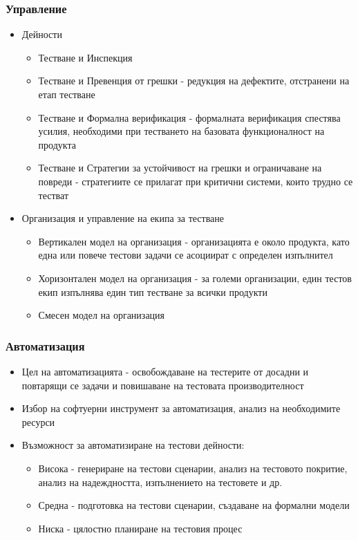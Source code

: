 \documentclass[fleqn,12pt]{article}
\begin{document}
\begin{flushleft}
\subsubsection{Управление}
    \begin{itemize}
        \item Дейности
        \begin{itemize}
            \item Тестване и Инспекция
            \item Тестване и Превенция от грешки - редукция на дефектите, отстранени на етап тестване
            \item Тестване и Формална верификация - формалната верификация спестява усилия, необходими при тестването на базовата функционалност на продукта
            \item Тестване и Стратегии за устойчивост на грешки и ограничаване на повреди - стратегиите се прилагат при критични системи, които трудно се тестват
        \end{itemize}
        \item Организация и управление на екипа за тестване
        \begin{itemize}
            \item Вертикален модел на организация - организацията е около продукта, като една или повече тестови задачи се асоциират с определен изпълнител
            \item Хоризонтален модел на организация - за големи организации, един тестов екип изпълнява един тип тестване за всички продукти
            \item Смесен модел на организация
        \end{itemize}
    \end{itemize}
\subsubsection{Автоматизация}
    \begin{itemize}
        \item Цел на автоматизацията - освобождаване на тестерите от досадни и повтарящи се задачи и повишаване на тестовата производителност
        \item Избор на софтуерни инструмент за автоматизация, анализ на необходимите ресурси
        \item Възможност за автоматизиране на тестови дейности:
        \begin{itemize}
            \item Висока - генериране на тестови сценарии, анализ на тестовото покритие, анализ на надеждността, изпълнението на тестовете и др.
            \item Средна - подготовка на тестови сценарии, създаване на формални модели
            \item Ниска - цялостно планиране на тестовия процес
        \end{itemize}
    \end{itemize}


\end{flushleft}
\end{document}

